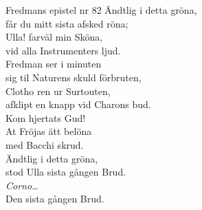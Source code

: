 \begin{song}{Fredmans epistel nr 82}
	\showversenumber
	Ändtlig i detta gröna,\\
	får du mitt sista afsked röna;\\
	Ulla! farväl min Sköna,\\
	vid alla Instrumenters ljud.\\
	Fredman ser i minuten\\
	sig til Naturens skuld förbruten,\\
	Clotho ren ur Surtouten,\\
	afklipt en knapp vid Charons bud.\\
	Kom hjertats Gud!\\
	At Fröjas ätt belöna\\
	med Bacchi skrud.\\
	Ändtlig i detta gröna,\\
	stod Ulla sista gången Brud.\\
	\emph{Corno\ldots{}}\\
	Den sista gången Brud.
	
\end{song}
